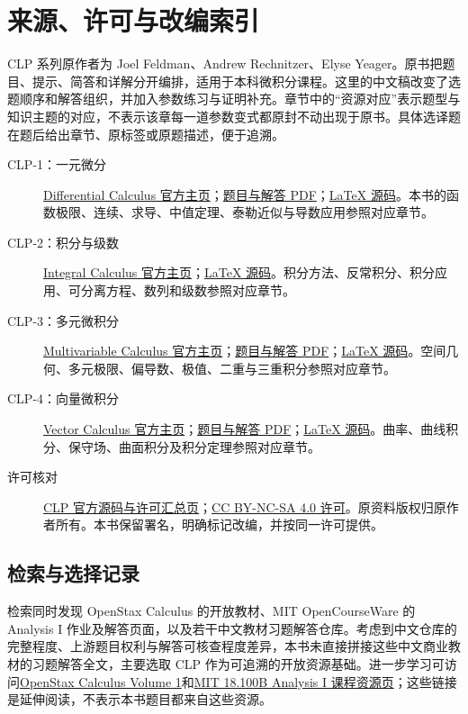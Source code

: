 \documentclass[12pt,fontset=fandol]{ctexart}
\begin{document}
\clearpage
\section*{来源、许可与改编索引}
\label{sec:sources}
CLP 系列原作者为 Joel Feldman、Andrew Rechnitzer、Elyse Yeager。原书把题目、提示、简答和详解分开编排，适用于本科微积分课程。这里的中文稿改变了选题顺序和解答组织，并加入参数练习与证明补充。章节中的“资源对应”表示题型与知识主题的对应，不表示该章每一道参数变式都原封不动出现于原书。具体选译题在题后给出章节、原标签或原题描述，便于追溯。
\begin{description}
\item[CLP-1：一元微分] \href{https://personal.math.ubc.ca/~CLP/CLP1/}{Differential Calculus 官方主页}；\href{https://personal.math.ubc.ca/~CLP/CLP1/clp_1_dc_problems.pdf}{题目与解答 PDF}；\href{https://github.com/arechnitzer/CLP1}{LaTeX 源码}。本书的函数极限、连续、求导、中值定理、泰勒近似与导数应用参照对应章节。
\item[CLP-2：积分与级数] \href{https://personal.math.ubc.ca/~CLP/CLP2/}{Integral Calculus 官方主页}；\href{https://github.com/arechnitzer/CLP2}{LaTeX 源码}。积分方法、反常积分、积分应用、可分离方程、数列和级数参照对应章节。
\item[CLP-3：多元微积分] \href{https://personal.math.ubc.ca/~CLP/CLP3/}{Multivariable Calculus 官方主页}；\href{https://personal.math.ubc.ca/~CLP/CLP3/clp_3_mc_problems.pdf}{题目与解答 PDF}；\href{https://github.com/arechnitzer/CLP3}{LaTeX 源码}。空间几何、多元极限、偏导数、极值、二重与三重积分参照对应章节。
\item[CLP-4：向量微积分] \href{https://personal.math.ubc.ca/~CLP/CLP4/}{Vector Calculus 官方主页}；\href{https://personal.math.ubc.ca/~CLP/CLP4/clp_4_vc_problems.pdf}{题目与解答 PDF}；\href{https://github.com/arechnitzer/CLP4}{LaTeX 源码}。曲率、曲线积分、保守场、曲面积分及积分定理参照对应章节。
\item[许可核对] \href{https://personal.math.ubc.ca/~CLP/src/}{CLP 官方源码与许可汇总页}；\href{https://creativecommons.org/licenses/by-nc-sa/4.0/}{CC BY-NC-SA 4.0 许可}。原资料版权归原作者所有。本书保留署名，明确标记改编，并按同一许可提供。
\end{description}
\subsection*{检索与选择记录}
检索同时发现 OpenStax Calculus 的开放教材、MIT OpenCourseWare 的 Analysis I 作业及解答页面，以及若干中文教材习题解答仓库。考虑到中文仓库的完整程度、上游题目权利与解答可核查程度差异，本书未直接拼接这些中文商业教材的习题解答全文，主要选取 CLP 作为可追溯的开放资源基础。进一步学习可访问\href{https://openstax.org/details/books/calculus-volume-1}{OpenStax Calculus Volume 1}和\href{https://ocw.mit.edu/courses/18-100b-analysis-i-fall-2010/download/}{MIT 18.100B Analysis I 课程资源页}；这些链接是延伸阅读，不表示本书题目都来自这些资源。
\end{document}
